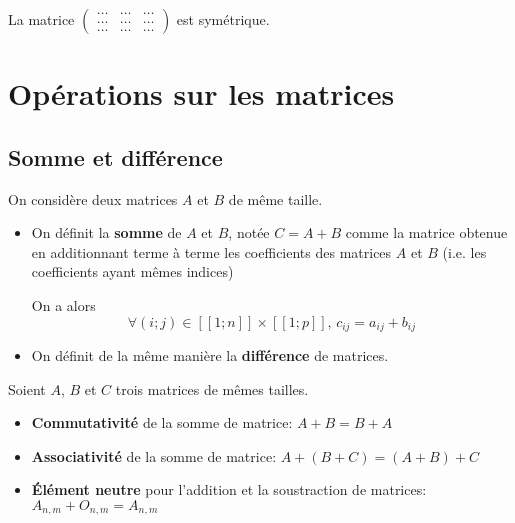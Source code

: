 \documentclass[a4paper]{article}
\begin{document}
\bigskip

\begin{example}{}{}
	La matrice $\begin{pmatrix}
\ldots & \ldots & \ldots \\
\ldots & \ldots & \ldots \\
\ldots & \ldots & \ldots
\end{pmatrix}$ est symétrique.
\end{example}



\section{Opérations sur les matrices}

\subsection{Somme et différence}

\begin{definition}{}{}
	On considère deux matrices $A$ et $B$ de même taille.

\begin{itemize}[label=\textbullet]
	\item On définit la \textbf{somme} de $A$ et $B$, notée $C=A + B$ comme la matrice obtenue en additionnant terme à terme les coefficients des matrices $A$ et $B$ (i.e. les coefficients ayant mêmes indices)
	
	On a alors $$\forall (i;j) \in [\![1;n]\!]\times [\![1;p]\!], \, c_{ij}=a_{ij}+b_{ij}$$
	
	\item On définit de la même manière la \textbf{différence} de matrices.
	
	 
\end{itemize}
\end{definition}


\begin{propriete}{}{}
	Soient $A$, $B$ et $C$ trois matrices de mêmes tailles.

\begin{itemize}[label=\textbullet]
	\item \textbf{Commutativité} de la somme de matrice: $A+B=B+A$
	\item \textbf{Associativité} de la somme de matrice: $A+(B+C)=(A+B)+C$
	\item \textbf{Élément neutre} pour l'addition et la soustraction de matrices: $A_{n,m}+O_{n,m}=A_{n,m} $
\end{itemize}
\end{propriete}
\end{document}
